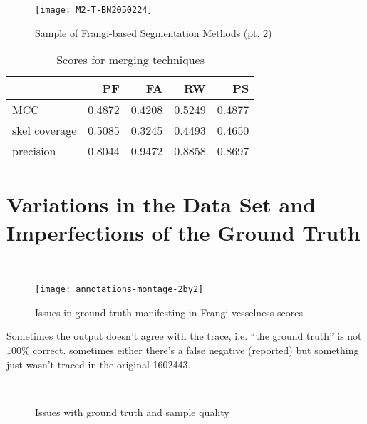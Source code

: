 \begin{figure}[p] \centering
	\texttt{[image: M2-T-BN2050224]}
	\caption{Sample of Frangi-based Segmentation Methods (pt. 2)}
\end{figure}

\begin{table}[p]\centering
	\begin{tabular}{l|rrrr}
		{} &        PF &        FA &        RW &        PS \\
		\hline
		MCC           &  0.4872 &  0.4208 &  0.5249 &  0.4877 \\
		skel coverage &  0.5085 &  0.3245 &  0.4493 &  0.4650 \\
		precision     &  0.8044 &  0.9472 &  0.8858 &  0.8697 \\
	\end{tabular}
	\caption{Scores for merging techniques}
\end{table}

\section{Variations in the Data Set and Imperfections of the Ground Truth} \label{sec:NCS-dataset-issues}
\
\begin{sidewaysfigure}
	\texttt{[image: annotations-montage-2by2]}
	\caption{Issues in ground truth manifesting in Frangi vesselness scores}
	\label{fig-annotated-montage}
\end{sidewaysfigure}




Sometimes the output doesn't agree with the trace, i.e. ``the ground truth'' is not 100\% correct.
sometimes either there's a false negative (reported) but something just wasn't traced in the original  1602443.

\begin{figure} \centering
 \\
\caption{Issues with ground truth and sample quality}
\label{fig:groundtruth-samplequality}
\end{figure}

